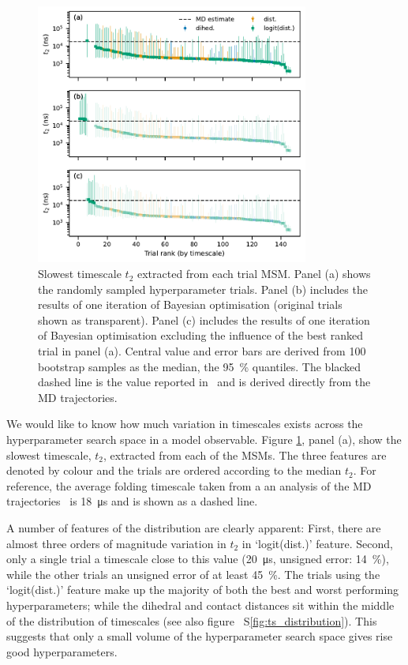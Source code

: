 \documentclass[journal=jacsat,manuscript=article]{achemso}
\newcommand*\sref[1]{%
    S\ref{#1}}
\begin{document}
\begin{figure}
    \centering
    \includegraphics[width=0.8\textwidth]{figures/1fme_timescales.pdf}
    \caption{Slowest timescale $t_{2}$ extracted from each trial MSM. Panel (a) shows the randomly sampled hyperparameter trials. Panel (b) includes the results of one iteration of Bayesian optimisation (original trials shown as transparent). Panel (c) includes the results of one iteration of Bayesian optimisation excluding the influence of the best ranked trial in panel (a).  Central value and error bars are derived from 100 bootstrap samples as the median, the \SI{95}{\percent} quantiles. The blacked dashed line is the value  reported in~\cite{lindorff-larsen_how_2011} and is derived directly from the MD trajectories.} 
    \label{fig:1fme_timescales}
\end{figure}

We would like to know how much variation in timescales exists across the hyperparameter search space in a model observable. Figure \ref{fig:1fme_timescales}, panel (a), show the slowest timescale, $t_2$, extracted from each of the MSMs. The three features are denoted by colour and the trials are ordered according to the median $t_2$. For reference, the average folding timescale taken from a an analysis of the MD trajectories~\cite{lindorff-larsen_how_2011} is \SI{18}{\micro\second} and is shown as a dashed line.  

A number of features of the distribution are clearly apparent: First, there are almost three orders of magnitude variation in $t_2$ in `logit(dist.)' feature. Second, only a single trial  a timescale close to this value (\SI{20}{\micro\second}, unsigned error: \SI{14}{\percent}), while the other trials an unsigned error of  at least \SI{45}{\percent}. The trials using the `logit(dist.)' feature make up the majority of both the best and worst performing hyperparameters; while the dihedral and contact distances sit within the middle of the distribution of timescales (see also figure~\sref{fig:ts_distribution}). This suggests that only a small volume of the hyperparameter search space gives rise good hyperparameters.  
\end{document}
